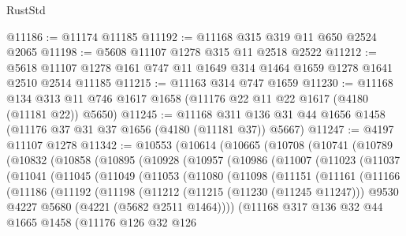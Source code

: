 \begin{lexlean}{RustStd}
\begin{coremodule}
{\begin{coremodule}
{{{{{{{{{{{{{{{{{{{{{{{{{{{{{{{@11186 := @11174 @11185
@11192 := @11168 @315 @319 @11 @650 @2524 @2065
@11198 := @5608 @11107 @1278 @315 @11 @2518 @2522
@11212 := @5618 @11107 @1278 @161 @747 @11 @1649 @314 @1464 @1659 @1278 @1641 @2510 @2514 @11185
@11215 := @11163 @314 @747 @1659
@11230 := @11168
    @134
    @313
    @11
    @746
    @1617
    @1658
    (@11176 @22 @11 @22 @1617 (@4180 (@11181 @22)) @5650)
@11245 := @11168 @311 @136 @31 @44 @1656 @1458 (@11176 @37 @31 @37 @1656 (@4180 (@11181 @37)) @5667)
@11247 := @4197 @11107 @1278
@11342 := @10553
    (@10614
      (@10665
        (@10708
          (@10741
            (@10789
              (@10832
                (@10858
                  (@10895
                    (@10928
                      (@10957
                        (@10986
                          (@11007
                            (@11023
                              (@11037
                                (@11041
                                  (@11045
                                    (@11049
                                      (@11053
                                        (@11080
                                          (@11098
                                            (@11151
                                              (@11161
                                                (@11166
                                                  (@11186
                                                    (@11192
                                                      (@11198
                                                        (@11212
                                                          (@11215 (@11230 (@11245 @11247)))
                                                          @9530
                                                          @4227
                                                          @5680
                                                          (@4221 (@5682 @2511 @1464))))
                                                      (@11168
                                                        @317
                                                        @136
                                                        @32
                                                        @44
                                                        @1665
                                                        @1458
                                                        (@11176
                                                          @126
                                                          @32
                                                          @126
}}}}}}}}}}}}}}}}}}}}}}}}}}}}}}}
\end{coremodule}}
\end{coremodule}
\end{lexlean}

